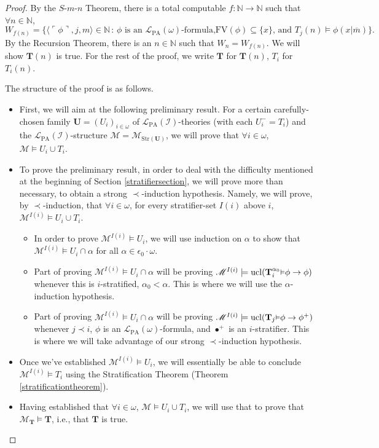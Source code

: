 \documentclass[reqno]{article}
\theoremstyle{definition}
\def\N{\mathbb{N}}
\def\L{\mathscr{L}}
\def\M{\mathscr{M}}
\def\T{\mathbf{T}}
\def\U{\mathbf{U}}
\def\FV{\mathrm{FV}}
\def\LPA{\L_{\mathrm{PA}}}
\def\epom{\epsilon_0\cdot\omega}
\def\indset{\mathcal I}
\renewcommand{\Pr}[1]{\T_{#1}\mbox{\small${\vDash}$}}
\newcommand{\Prr}[2]{\T^{#1}_{#2}\mbox{\small${\vDash}$}}
\newcommand{\ucl}[1]{\mathrm{ucl}(#1)}
\newcommand{\str}[1]{\mathrm{Str}(#1)} \newcommand{\Str}[1]{\str{#1}}
\begin{document}
\begin{proof}
By the $S$-$m$-$n$ Theorem, there is a total computable $f:\N\to\N$ such that $\forall n\in\N$,
\[
W_{f(n)}=\{\langle\ulcorner\phi\urcorner,j,m\rangle\in\N\,:\,\mbox{$\phi$ is an $\LPA(\omega)$-formula,
$\FV(\phi)\subseteq\{x\}$, and $T_j(n)\models\phi(x|\overline m)$}\}.
\]
By the Recursion Theorem, there is an $n\in\N$ such that $W_n=W_{f(n)}$.
We will show $\T(n)$ is true.
For the rest of the proof, we write $\T$ for $\T(n)$, $T_i$ for $T_i(n)$.

The structure of the proof is as follows.
\begin{itemize}
\item
First, we will aim at the following preliminary result.
For a certain carefully-chosen
family $\U=(U_i)_{i\in\omega}$ of $\LPA(\indset)$-theories
(with each $U^-_i=T_i$)
and the $\LPA(\indset)$-structure $\M=\M_{\str{\U}}$,
we will prove that $\forall i\in\omega$, $\M\models U_i\cup T_i$.
\item
To prove the preliminary result,
in order to deal with the difficulty mentioned at
the beginning of Section \ref{stratifiersection},
we will prove more than necessary, to obtain a strong $\prec$-induction hypothesis.
Namely, we will prove, by $\prec$-induction, that $\forall i\in\omega$,
for every stratifier-set $I(i)$ above $i$,
$\M^{I(i)}\models U_i\cup T_i$.
    \begin{itemize}
    \item
    In order to prove $\M^{I(i)}\models U_i$, we will
    use induction on $\alpha$ to show that $\M^{I(i)}\models U_i\cap\alpha$
    for all $\alpha\in\epom$.
    \item
    Part of proving $\M^{I(i)}\models U_i\cap\alpha$ will be proving
    $\M^{I(i)}\models\ucl{\Prr{\alpha_0} i\phi\rightarrow\phi}$
    whenever this is $i$-stratified, $\alpha_0<\alpha$.
    This is where we will use the $\alpha$-induction hypothesis.
    \item
    Part of proving $\M^{I(i)}\models U_i\cap\alpha$ will be proving
    $\M^{I(i)}\models\ucl{\Pr j\phi\rightarrow\phi^+}$
    whenever $j\prec i$, $\phi$ is an $\LPA(\omega)$-formula,
    and $\bullet^+$ is an $i$-stratifier. This is where we will take advantage
    of our strong $\prec$-induction hypothesis.
    \end{itemize}
\item
Once we've established $\M^{I(i)}\models U_i$, we will essentially
be able to conclude
$\M^{I(i)}\models T_i$ using the Stratification Theorem
(Theorem \ref{stratificationtheorem}).
\item
Having established that $\forall i\in\omega$, $\M\models U_i\cup T_i$,
we will use that to prove that $\M_\T\models\T$, i.e., that $\T$ is true.
\end{itemize}


\end{proof}
\end{document}
